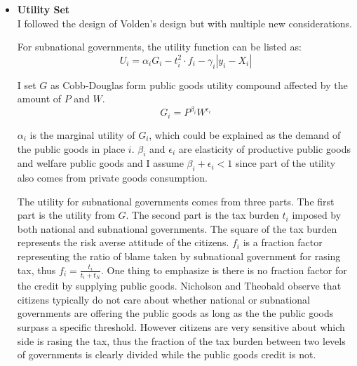 \begin{itemize}
\item \textbf{Utility Set}\\
I followed the design of Volden's design but with multiple new considerations.

For subnational governments, the utility function can be listed as:
$$U_i=\alpha_i G_i-t_{i}^2\cdot f_i-\gamma_i\left|y_i-X_i\right|$$

I set $G$ as  Cobb-Douglas form public goods utility compound affected by the amount of $P$ and $W$.
$$G_i= P^{\beta_i} W^{\epsilon_i}$$ \label{pgmatrix}

$\alpha_i$ is the marginal utility of $G_i$, which could be explained as the demand of the public goods in place $i$. $\beta_i$ and $\epsilon_i$ are elasticity of productive public goods and welfare public goods and I assume $\beta_i + \epsilon_i<1 $ since part of the utility also comes from private goods consumption.

The utility for subnational governments comes from three parts. The first part is the utility from $G$. The second part is the tax burden $t_{i}$ imposed by both national and subnational governments. The square of the tax burden represents the risk averse attitude of the citizens. $f_i$ is a fraction factor representing the ratio of blame taken by subnational government for rasing tax, thus $f_i=\frac{t_i}{t_i+t_N}$. One thing to emphasize is there is no fraction factor for the credit by supplying public goods. Nicholson and Theobald \cite{nicholson2011claiming} observe that citizens typically do not care about whether national or subnational governments are offering the public goods as long as the the public goods surpass a specific threshold. However citizens are very sensitive about which side is rasing the tax, thus the fraction of the tax burden between two levels of governments is clearly divided while the public goods credit is not.


\end{itemize}
